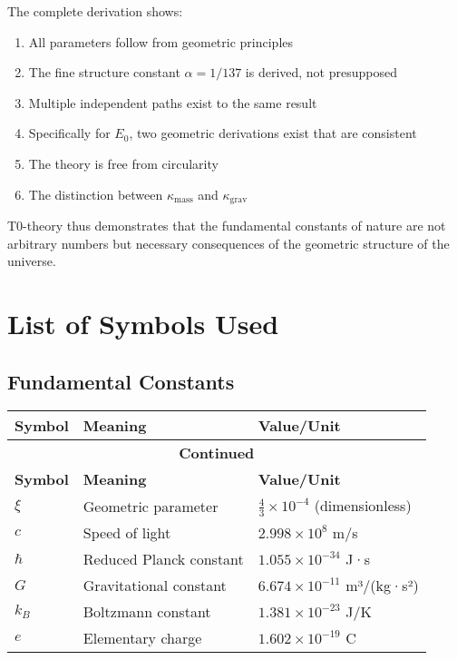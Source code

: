 \documentclass[12pt,a4paper]{article}
\begin{document}
	The complete derivation shows:
	\begin{enumerate}
		\item All parameters follow from geometric principles
		\item The fine structure constant $\alpha = 1/137$ is derived, not presupposed
		\item Multiple independent paths exist to the same result
		\item Specifically for $E_0$, two geometric derivations exist that are consistent
		\item The theory is free from circularity
		\item The distinction between $\kappa_{\text{mass}}$ and $\kappa_{\text{grav}}$
	\end{enumerate}
	
	T0-theory thus demonstrates that the fundamental constants of nature are not arbitrary numbers but necessary consequences of the geometric structure of the universe.


\section{List of Symbols Used}
\label{app:symbols_en}

\subsection{Fundamental Constants}
\begin{longtable}{lll}
	\toprule
	\textbf{Symbol} & \textbf{Meaning} & \textbf{Value/Unit} \\
	\midrule
	\endfirsthead
	\multicolumn{3}{c}{{\bfseries Continued}} \\
	\toprule
	\textbf{Symbol} & \textbf{Meaning} & \textbf{Value/Unit} \\
	\midrule
	\endhead
	\bottomrule
	\endfoot
	\bottomrule
	\endlastfoot
	
	$\xi$ & Geometric parameter & $\frac{4}{3} \times 10^{-4}$ (dimensionless) \\
	$c$ & Speed of light & $2.998 \times 10^8$ m/s \\
	$\hbar$ & Reduced Planck constant & $1.055 \times 10^{-34}$ J·s \\
	$G$ & Gravitational constant & $6.674 \times 10^{-11}$ m³/(kg·s²) \\
	$k_B$ & Boltzmann constant & $1.381 \times 10^{-23}$ J/K \\
	$e$ & Elementary charge & $1.602 \times 10^{-19}$ C \\
\end{longtable}
\end{document}
